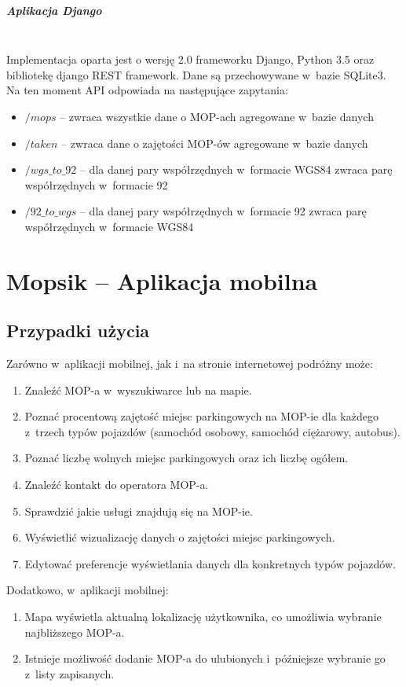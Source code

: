 \paragraph{Aplikacja Django}\mbox{}\\
Implementacja oparta jest o wersję 2.0 frameworku Django, Python 3.5 oraz bibliotekę django REST framework. Dane są przechowywane w~bazie SQLite3. Na ten moment API odpowiada na następujące zapytania:
\begin{itemize}
\item $/mops$ -- zwraca wszystkie dane o MOP-ach agregowane w~bazie danych
\item $/taken$ -- zwraca dane o zajętości MOP-ów agregowane w~bazie danych
\item $/wgs\_to\_92$ -- dla danej pary współrzędnych w~formacie WGS84 zwraca parę współrzędnych w~formacie 92
\item $/92\_to\_wgs$ -- dla danej pary współrzędnych w~formacie 92 zwraca parę współrzędnych w~formacie WGS84
\end{itemize}


\chapter{Mopsik -- Aplikacja mobilna}
\label{mopsik_mobile}

\section{Przypadki użycia}
\label{mopsik_usecase}
Zarówno w~aplikacji mobilnej, jak i~na stronie internetowej podróżny może:
\begin{enumerate}
\item Znaleźć MOP-a w~wyszukiwarce lub na mapie.
\item Poznać procentową zajętość miejsc parkingowych na MOP-ie dla każdego z~trzech typów pojazdów (samochód osobowy, samochód ciężarowy, autobus).
\item Poznać liczbę wolnych miejsc parkingowych oraz ich liczbę ogółem.
\item Znaleźć kontakt do operatora MOP-a.
\item Sprawdzić jakie usługi znajdują się na MOP-ie.
\item Wyświetlić wizualizację danych o zajętości miejsc parkingowych.
\item Edytować preferencje wyświetlania danych dla konkretnych typów pojazdów.
\end{enumerate}
Dodatkowo, w~aplikacji mobilnej:
\begin{enumerate}
\item Mapa wyświetla aktualną lokalizację użytkownika, co umożliwia wybranie najbliższego MOP-a. 
\item Istnieje możliwość dodanie MOP-a do ulubionych i~późniejsze wybranie go z~listy zapisanych.
\end{enumerate}


